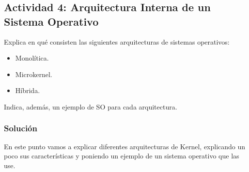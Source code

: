 \subsection{Actividad 4: Arquitectura Interna de un Sistema Operativo}
Explica en qué consisten las siguientes arquitecturas de sistemas operativos:

\begin{itemize}
    \item Monolítica.
    \item Microkernel.
    \item Híbrida.
\end{itemize}

Indica, además, un ejemplo de SO para cada arquitectura.

\subsubsection{Solución}
En este punto vamos a explicar diferentes arquitecturas de Kernel, explicando un poco sus características y poniendo un ejemplo de un sistema operativo que las use.

